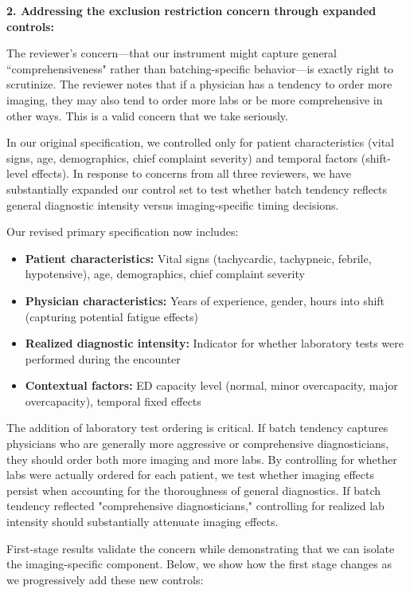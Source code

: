 \documentclass[11pt]{article}
\newcommand{\1}{\hbox{\rm 1\kern-.35em 1}}
\begin{document}
{\textbf{2. Addressing the exclusion restriction concern through expanded controls:}

The reviewer's concern—that our instrument might capture general ``comprehensiveness" rather than batching-specific behavior—is exactly right to scrutinize. The reviewer notes that if a physician has a tendency to order more imaging, they may also tend to order more labs or be more comprehensive in other ways. This is a valid concern that we take seriously.

In our original specification, we controlled only for patient characteristics (vital signs, age, demographics, chief complaint severity) and temporal factors (shift-level effects). In response to concerns from all three reviewers, we have substantially expanded our control set to test whether batch tendency reflects general diagnostic intensity versus imaging-specific timing decisions.

Our revised primary specification now includes:

\begin{itemize}
\item \textbf{Patient characteristics:} Vital signs (tachycardic, tachypneic, febrile, hypotensive), age, demographics, chief complaint severity
\item \textbf{Physician characteristics:} Years of experience, gender, hours into shift (capturing potential fatigue effects)
\item \textbf{Realized diagnostic intensity:} Indicator for whether laboratory tests were performed during the encounter
\item \textbf{Contextual factors:} ED capacity level (normal, minor overcapacity, major overcapacity), temporal fixed effects
\end{itemize}

The addition of laboratory test ordering is critical. If batch tendency captures physicians who are generally more aggressive or comprehensive diagnosticians, they should order both more imaging and more labs. By controlling for whether labs were actually ordered for each patient, we test whether imaging effects persist when accounting for the thoroughness of general diagnostics. If batch tendency reflected "comprehensive diagnosticians," controlling for realized lab intensity should substantially attenuate imaging effects.

First-stage results validate the concern while demonstrating that we can isolate the imaging-specific component. Below, we show how the first stage changes as we progressively add these new controls:

}
\end{document}
